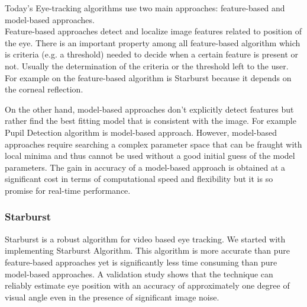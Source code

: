 Today's Eye-tracking algorithms use two main approaches: feature-based and model-based approaches. \bigskip \\
Feature-based approaches detect and localize image features related to position of the eye. There is an important property among all feature-based algorithm which is criteria (e.g. a threshold) needed to decide when a certain feature is present or not. Usually the determination of the criteria or the threshold left to the user. For example on the feature-based algorithm is Starburst because it depends on the corneal reflection. \bigskip \cite{starburst}

On the other hand, model-based approaches don't explicitly detect features but rather find the best fitting model that is consistent with the image. For example Pupil Detection algorithm is model-based approach. However, model-based approaches require searching a complex parameter space that can be fraught with local minima and thus cannot be used without a good initial guess of the model parameters. The gain in accuracy of a model-based approach is obtained at a significant cost in terms of computational speed and flexibility but it is so promise for real-time performance. \bigskip \cite{starburst}

 


\subsubsection{Starburst}
Starburst is a robust algorithm for video based eye tracking. We started with implementing Starburst Algorithm. This algorithm is more accurate than pure feature-based approaches yet is significantly less time consuming than pure model-based approaches. A validation study shows that the technique can reliably estimate eye position with an accuracy of approximately one degree of visual angle even in the presence of significant image noise. \bigskip

